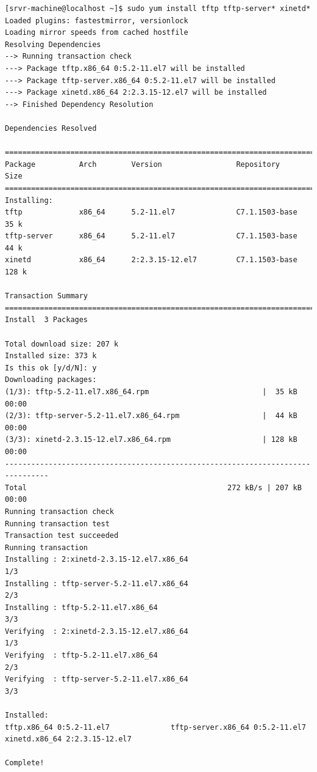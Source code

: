 \documentclass[11pt
  , a4paper
  , article
  , oneside
  , showtrims
]{memoir}
\begin{document}
\begin{lstlisting}[style=termstyle]
[srvr-machine@localhost ~]$ sudo yum install tftp tftp-server* xinetd*
Loaded plugins: fastestmirror, versionlock
Loading mirror speeds from cached hostfile
Resolving Dependencies
--> Running transaction check
---> Package tftp.x86_64 0:5.2-11.el7 will be installed
---> Package tftp-server.x86_64 0:5.2-11.el7 will be installed
---> Package xinetd.x86_64 2:2.3.15-12.el7 will be installed
--> Finished Dependency Resolution

Dependencies Resolved

================================================================================
Package          Arch        Version                 Repository           Size
================================================================================
Installing:
tftp             x86_64      5.2-11.el7              C7.1.1503-base       35 k
tftp-server      x86_64      5.2-11.el7              C7.1.1503-base       44 k
xinetd           x86_64      2:2.3.15-12.el7         C7.1.1503-base      128 k

Transaction Summary
================================================================================
Install  3 Packages

Total download size: 207 k
Installed size: 373 k
Is this ok [y/d/N]: y
Downloading packages:
(1/3): tftp-5.2-11.el7.x86_64.rpm                          |  35 kB   00:00     
(2/3): tftp-server-5.2-11.el7.x86_64.rpm                   |  44 kB   00:00     
(3/3): xinetd-2.3.15-12.el7.x86_64.rpm                     | 128 kB   00:00     
--------------------------------------------------------------------------------
Total                                              272 kB/s | 207 kB  00:00     
Running transaction check
Running transaction test
Transaction test succeeded
Running transaction
Installing : 2:xinetd-2.3.15-12.el7.x86_64                                1/3 
Installing : tftp-server-5.2-11.el7.x86_64                                2/3 
Installing : tftp-5.2-11.el7.x86_64                                       3/3 
Verifying  : 2:xinetd-2.3.15-12.el7.x86_64                                1/3 
Verifying  : tftp-5.2-11.el7.x86_64                                       2/3 
Verifying  : tftp-server-5.2-11.el7.x86_64                                3/3 

Installed:
tftp.x86_64 0:5.2-11.el7              tftp-server.x86_64 0:5.2-11.el7        
xinetd.x86_64 2:2.3.15-12.el7        

Complete!
\end{lstlisting}
\end{document}
